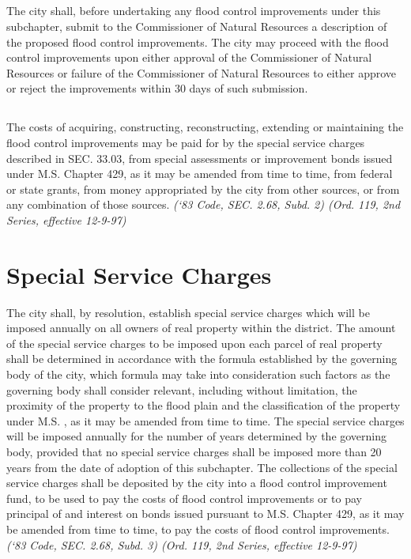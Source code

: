 \subsection{}
The city shall, before undertaking any flood control improvements under this subchapter, submit to the Commissioner of Natural Resources a description of the proposed flood control improvements.  The city may proceed with the flood control improvements upon either  approval of the Commissioner of Natural Resources or failure of the Commissioner of Natural Resources to either approve or reject the improvements within 30 days of such submission.
\subsection{}
The costs of acquiring, constructing, reconstructing, extending or maintaining the flood control improvements may be paid for by the special service charges described in SEC. 33.03, from special assessments or improvement bonds issued under M.S. Chapter 429, as it may be amended from time to time, from federal or state grants, from money appropriated by the city from other sources, or from any combination of those sources.\newline
\emph{(‘83 Code, SEC. 2.68, Subd. 2)  (Ord. 119, 2nd Series, effective 12-9-97)}
\section{Special Service Charges}
The city shall, by resolution, establish special service charges which will be imposed annually on all owners of real property within the district. The amount of the special service charges to be imposed upon each parcel of real property shall be determined in accordance with the formula established by the governing body of the city, which formula may take into consideration such factors as the governing body shall consider relevant, including without limitation, the proximity of the property to the flood plain and the classification of the property under M.S. , as it may be amended from time to time. The special service charges will be imposed annually for the number of years determined by the governing body, provided that no special service charges shall be imposed more than 20 years from the date of adoption of this subchapter. The collections of the special service charges shall be deposited by the city into a flood control improvement fund, to be used to pay the costs of flood control improvements or to pay principal of and interest on bonds issued pursuant to M.S. Chapter 429, as it may be amended from time to time, to pay the costs of flood control improvements.\newline
\emph{(‘83 Code, SEC. 2.68, Subd. 3)  (Ord. 119, 2nd Series, effective 12-9-97)}\newline

